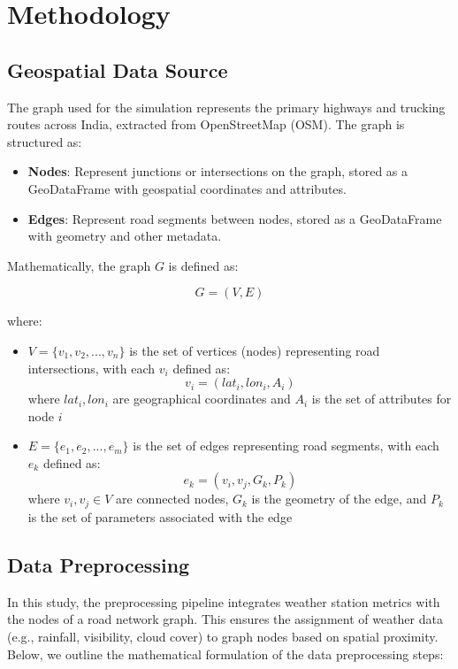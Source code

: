 \documentclass[sigplan,screen]{acmart}
\begin{document}
\section{Methodology}

\subsection{Geospatial Data Source}
The graph used for the simulation represents the primary highways and trucking routes across India, extracted from OpenStreetMap (OSM). The graph is structured as:

\begin{itemize}
    \item \textbf{Nodes}: Represent junctions or intersections on the graph, stored as a GeoDataFrame with geospatial coordinates and attributes.
    \item \textbf{Edges}: Represent road segments between nodes, stored as a GeoDataFrame with geometry and other metadata.
\end{itemize}

Mathematically, the graph $G$ is defined as:

\[G = (V, E)\]

where:
\begin{itemize}
    \item $V = \{v_1, v_2, ..., v_n\}$ is the set of vertices (nodes) representing road intersections, with each $v_i$ defined as:
    \[v_i = (lat_i, lon_i, A_i)\]
    where $lat_i, lon_i$ are geographical coordinates and $A_i$ is the set of attributes for node $i$
    
    \item $E = \{e_1, e_2, ..., e_m\}$ is the set of edges representing road segments, with each $e_k$ defined as:
    \[e_k = (v_i, v_j, G_k, P_k)\]
    where $v_i, v_j \in V$ are connected nodes, $G_k$ is the geometry of the edge, and $P_k$ is the set of parameters associated with the edge
\end{itemize}

\subsection{Data Preprocessing}

In this study, the preprocessing pipeline integrates weather station metrics with the nodes of a road network graph. This ensures the assignment of weather data (e.g., rainfall, visibility, cloud cover) to graph nodes based on spatial proximity. Below, we outline the mathematical formulation of the data preprocessing steps:
\end{document}
